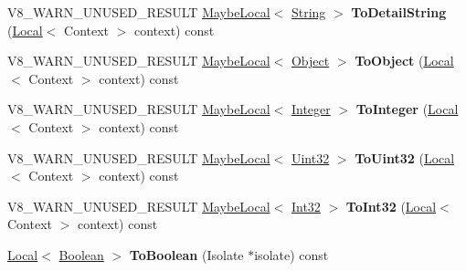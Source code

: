 \begin{DoxyCompactItemize}
\item 
\mbox{\label{classv8_1_1Value_ac68848409bb1316e12d40753b10d8f95}} 
V8\+\_\+\+W\+A\+R\+N\+\_\+\+U\+N\+U\+S\+E\+D\+\_\+\+R\+E\+S\+U\+LT \mbox{\hyperlink{classv8_1_1MaybeLocal}{Maybe\+Local}}$<$ \mbox{\hyperlink{classv8_1_1String}{String}} $>$ {\bfseries To\+Detail\+String} (\mbox{\hyperlink{classv8_1_1Local}{Local}}$<$ Context $>$ context) const
\item 
\mbox{\label{classv8_1_1Value_afd457c9a000253385b6a7a6ea555a16d}} 
V8\+\_\+\+W\+A\+R\+N\+\_\+\+U\+N\+U\+S\+E\+D\+\_\+\+R\+E\+S\+U\+LT \mbox{\hyperlink{classv8_1_1MaybeLocal}{Maybe\+Local}}$<$ \mbox{\hyperlink{classv8_1_1Object}{Object}} $>$ {\bfseries To\+Object} (\mbox{\hyperlink{classv8_1_1Local}{Local}}$<$ Context $>$ context) const
\item 
\mbox{\label{classv8_1_1Value_a8ee072ba57071d42b00a00e304fc03c0}} 
V8\+\_\+\+W\+A\+R\+N\+\_\+\+U\+N\+U\+S\+E\+D\+\_\+\+R\+E\+S\+U\+LT \mbox{\hyperlink{classv8_1_1MaybeLocal}{Maybe\+Local}}$<$ \mbox{\hyperlink{classv8_1_1Integer}{Integer}} $>$ {\bfseries To\+Integer} (\mbox{\hyperlink{classv8_1_1Local}{Local}}$<$ Context $>$ context) const
\item 
\mbox{\label{classv8_1_1Value_a57bf05495a18e7acffa3542334773c4b}} 
V8\+\_\+\+W\+A\+R\+N\+\_\+\+U\+N\+U\+S\+E\+D\+\_\+\+R\+E\+S\+U\+LT \mbox{\hyperlink{classv8_1_1MaybeLocal}{Maybe\+Local}}$<$ \mbox{\hyperlink{classv8_1_1Uint32}{Uint32}} $>$ {\bfseries To\+Uint32} (\mbox{\hyperlink{classv8_1_1Local}{Local}}$<$ Context $>$ context) const
\item 
\mbox{\label{classv8_1_1Value_a4d12475faee2804805517ae45bc16922}} 
V8\+\_\+\+W\+A\+R\+N\+\_\+\+U\+N\+U\+S\+E\+D\+\_\+\+R\+E\+S\+U\+LT \mbox{\hyperlink{classv8_1_1MaybeLocal}{Maybe\+Local}}$<$ \mbox{\hyperlink{classv8_1_1Int32}{Int32}} $>$ {\bfseries To\+Int32} (\mbox{\hyperlink{classv8_1_1Local}{Local}}$<$ Context $>$ context) const
\item 
\mbox{\label{classv8_1_1Value_a8e4ebb4e75cea1830e6a3b56e6a5a5c2}} 
\mbox{\hyperlink{classv8_1_1Local}{Local}}$<$ \mbox{\hyperlink{classv8_1_1Boolean}{Boolean}} $>$ {\bfseries To\+Boolean} (Isolate $\ast$isolate) const
\item 

\end{DoxyCompactItemize}
